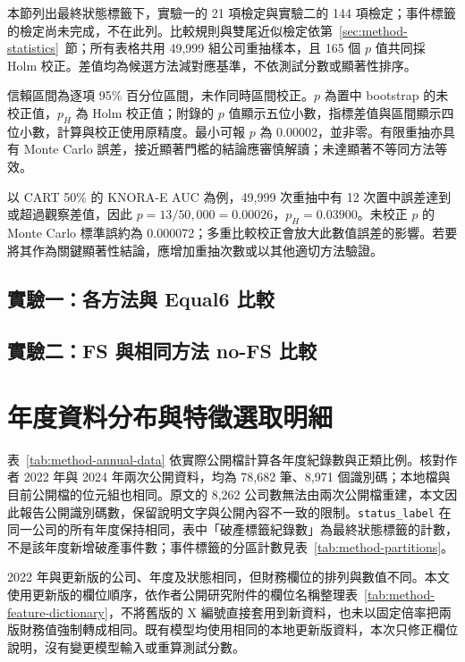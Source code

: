 本節列出最終狀態標籤下，實驗一的 21 項檢定與實驗二的 144 項檢定；事件標籤的檢定尚未完成，不在此列。比較規則與雙尾近似檢定依第~\ref{sec:method-statistics}~節；所有表格共用 49,999 組公司重抽樣本，且 165 個 \(p\) 值共同採 Holm 校正。差值均為候選方法減對應基準，不依測試分數或顯著性排序。

信賴區間為逐項 95\% 百分位區間，未作同時區間校正。\(p\) 為置中 bootstrap 的未校正值，\(p_H\) 為 Holm 校正值；附錄的 \(p\) 值顯示五位小數，指標差值與區間顯示四位小數，計算與校正使用原精度。最小可報 \(p\) 為 0.00002，並非零。有限重抽亦具有 Monte Carlo 誤差，接近顯著門檻的結論應審慎解讀；未達顯著不等同方法等效。

以 CART 50\% 的 KNORA-E AUC 為例，49,999 次重抽中有 12 次置中誤差達到或超過觀察差值，因此 \(p=13/50{,}000=0.00026\)，\(p_H=0.03900\)。未校正 \(p\) 的 Monte Carlo 標準誤約為 0.000072；多重比較校正會放大此數值誤差的影響。若要將其作為關鍵顯著性結論，應增加重抽次數或以其他適切方法驗證。

\subsection*{實驗一：各方法與 Equal6 比較}


\subsection*{實驗二：FS 與相同方法 no-FS 比較}




\clearpage
\section{年度資料分布與特徵選取明細}\label{sec:appendix-data-fs}

表~\ref{tab:method-annual-data} 依實際公開檔計算各年度紀錄數與正類比例。核對作者 2022 年與 2024 年兩次公開資料，均為 78,682 筆、8,971 個識別碼；本地檔與目前公開檔的位元組也相同。原文的 8,262 公司數無法由兩次公開檔重建，本文因此報告公開識別碼數，保留說明文字與公開內容不一致的限制。\nolinkurl{status_label} 在同一公司的所有年度保持相同，表中「破產標籤紀錄數」為最終狀態標籤的計數，不是該年度新增破產事件數；事件標籤的分區計數見表~\ref{tab:method-partitions}。

2022 年與更新版的公司、年度及狀態相同，但財務欄位的排列與數值不同。本文使用更新版的欄位順序，依作者公開研究附件的欄位名稱整理表~\ref{tab:method-feature-dictionary}，不將舊版的 X 編號直接套用到新資料，也未以固定倍率把兩版財務值強制轉成相同。既有模型均使用相同的本地更新版資料，本次只修正欄位說明，沒有變更模型輸入或重算測試分數。

